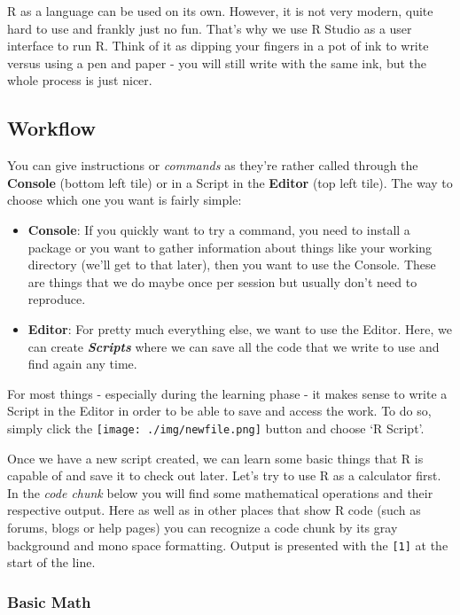 \documentclass[
]{book}
\providecommand{\tightlist}{%
  \setlength{\itemsep}{0pt}\setlength{\parskip}{0pt}}
\begin{document}
R as a language can be used on its own.
However, it is not very modern, quite hard to use and frankly just no fun.
That's why we use R Studio as a user interface to run R.
Think of it as dipping your fingers in a pot of ink to write versus using a pen and paper - you will still write with the same ink, but the whole process is just nicer.

\subsection{Workflow}\label{workflow}

You can give instructions or \emph{commands} as they're rather called through the \textbf{Console} (bottom left tile) or in a Script in the \textbf{Editor} (top left tile).
The way to choose which one you want is fairly simple:

\begin{itemize}
\tightlist
\item
  \textbf{Console}: If you quickly want to try a command, you need to install a package or you want to gather information about things like your working directory (we'll get to that later), then you want to use the Console. These are things that we do maybe once per session but usually don't need to reproduce.
\item
  \textbf{Editor}: For pretty much everything else, we want to use the Editor. Here, we can create \textbf{\emph{Scripts}} where we can save all the code that we write to use and find again any time.
\end{itemize}

For most things - especially during the learning phase - it makes sense to write a Script in the Editor in order to be able to save and access the work.
To do so, simply click the \texttt{[image: ./img/newfile.png]} button and choose `R Script'.

Once we have a new script created, we can learn some basic things that R is capable of and save it to check out later.
Let's try to use R as a calculator first.
In the \emph{code chunk} below you will find some mathematical operations and their respective output.
Here as well as in other places that show R code (such as forums, blogs or help pages) you can recognize a code chunk by its gray background and mono space formatting.
Output is presented with the \texttt{{[}1{]}} at the start of the line.

\subsubsection*{Basic Math}\label{basic-math}
\end{document}
